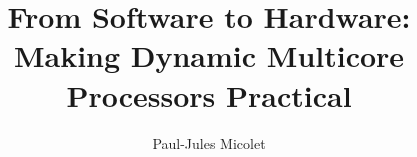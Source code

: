 \documentclass[phd,icsa,twoside]{infthesis}
\title{From Software to Hardware: Making Dynamic Multicore Processors Practical}
\author{Paul-Jules Micolet}
\begin{document}
\begin{preliminary}

\maketitle



\standarddeclaration


\tableofcontents


\end{preliminary}


\label{chp:bg}




\label{chp3}






%




\end{document}
